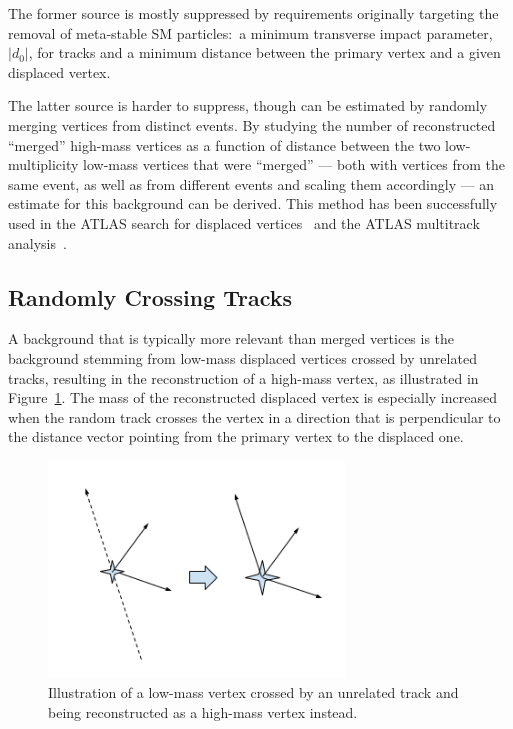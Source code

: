 The former source is mostly suppressed by requirements originally targeting the removal of meta-stable SM particles:~a minimum transverse impact parameter, $|d_0|$, for tracks and a minimum distance between the primary vertex and a given displaced vertex.

The latter source is harder to suppress, though can be estimated by randomly merging vertices from distinct events. By studying the number of reconstructed ``merged'' high-mass vertices as a function of distance between the two low-multiplicity low-mass vertices that were ``merged'' --- both with vertices from the same event, as well as from different events and scaling them accordingly --- an estimate for this background can be derived. This method has been successfully used in the ATLAS search for displaced vertices~\cite{Aaboud:2017iio} and the ATLAS multitrack analysis~\cite{Aad:2015rba}.

\subsection{Randomly Crossing Tracks} %

A background that is typically more relevant than merged vertices is the background stemming from low-mass displaced vertices crossed by unrelated tracks, resulting in the reconstruction of a high-mass vertex, as illustrated in Figure~\ref{fig:randomcrossing}. The mass of the reconstructed displaced vertex is especially increased when the random track crosses the vertex in a direction that is perpendicular to the distance vector pointing from the primary vertex to the displaced one.

\begin{figure}[h]
  \centering
  \includegraphics[width=0.7\textwidth]{figures/randomcrossing.png}
  \caption{Illustration of a low-mass vertex crossed by an unrelated track and being reconstructed as a high-mass vertex instead.}
  \label{fig:randomcrossing}
\end{figure}

